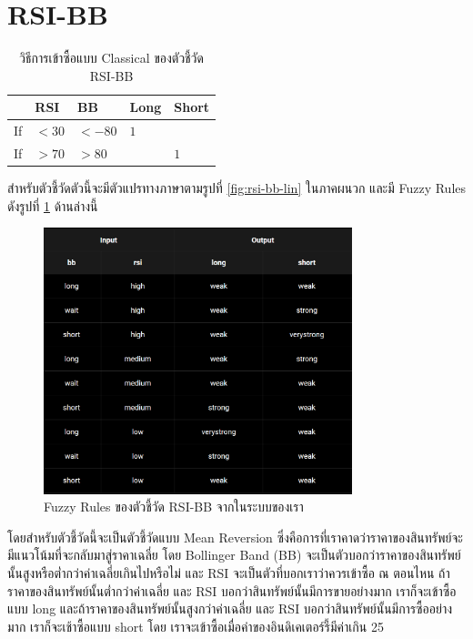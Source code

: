\section{RSI-BB}
\begin{table}[ht]
    \centering
    \begin{tabular}{lllll}
        \hline
           & RSI   & BB     & Long & Short \\ \hline
        If & $<30$ & $<-80$ & $1$  &       \\ \hline
        If & $>70$ & $>80$  &      & $1$   \\ \hline
    \end{tabular}
    \caption{วิธีการเข้าซื้อแบบ Classical ของตัวชี้วัด RSI-BB}
\end{table}

สำหรับตัวชี้วัดตัวนี้จะมีตัวแปรทางภาษาตามรูปที่ \ref{fig:rsi-bb-lin} ในภาคผนวก และมี Fuzzy Rules ดังรูปที่ \ref{fig:rsi-bb-rules} ด้านล่างนี้
\begin{figure}[!ht]
    \centering
    \includegraphics[width=0.8\textwidth]{images/rsi-bb-rules.png}
    \caption{Fuzzy Rules ของตัวชี้วัด RSI-BB จากในระบบของเรา}
    \label{fig:rsi-bb-rules}
\end{figure}

โดยสำหรับตัวชี้วัดนี้จะเป็นตัวชี้วัดแบบ Mean Reversion ซึ่งคือการที่เราคาดว่าราคาของสินทรัพย์จะมีแนวโน้มที่จะกลับมาสู่ราคาเฉลี่ย โดย Bollinger Band (BB) จะเป็นตัวบอกว่าราคาของสินทรัพย์นั้นสูงหรือต่ำกว่าค่าเฉลี่ยเกินไปหรือไม่ และ RSI จะเป็นตัวที่บอกเราว่าควรเข้าซื้อ ณ ตอนไหน ถ้าราคาของสินทรัพย์นั้นต่ำกว่าค่าเฉลี่ย และ RSI บอกว่าสินทรัพย์นั้นมีการขายอย่างมาก เราก็จะเข้าซื้อแบบ long และถ้าราคาของสินทรัพย์นั้นสูงกว่าค่าเฉลี่ย และ RSI บอกว่าสินทรัพย์นั้นมีการซื้ออย่างมาก เราก็จะเช้าซื้อแบบ short โดย เราจะเข้าซื้อเมื่อค่าของอินดิเคเตอร์รี้มีค่าเกิน 25

